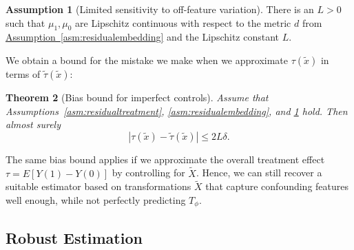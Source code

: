 \documentclass{article}
\theoremstyle{plain}
\newtheorem{theorem}{Theorem}[section]
\theoremstyle{definition}
\newtheorem{assumption}[theorem]{Assumption}
\theoremstyle{remark}
\newcommand{\myref}[2]{%
    \hyperref[#2]{#1~\ref*{#2}}%
}
\begin{document}
\begin{assumption}[Limited sensitivity to off-feature variation]
\label{asm:limitedsensitivity}
    There is an $L > 0$ such that $\mu_1, \mu_0$ are Lipschitz continuous with respect to the metric $d$ from \myref{Assumption}{asm:residualembedding} and the Lipschitz constant $L$.
\end{assumption}

We obtain a bound for the mistake we make when we approximate $\tau(\tilde{x})$ in terms of $\tilde{\tau}(\tilde{x})$:

\begin{theorem}[Bias bound for imperfect controls]
\label{thm:biasbound}
    Assume that Assumptions~\ref{asm:residualtreatment}, \ref{asm:residualembedding}, and \ref{asm:limitedsensitivity} hold. Then almost surely
    \begin{equation*}
        | \tau(\tilde{x}) - \tilde{\tau}(\tilde{x}) | \leq 2 L \delta.
    \end{equation*}
\end{theorem}
\vspace{-2pt}
The same bias bound applies if we approximate the overall treatment effect $\tau = E[Y(1) - Y(0)]$ by controlling for $\tilde{X}$.
Hence, we can still recover a suitable estimator based on transformations $\tilde{X}$ that capture confounding features well enough, while not perfectly predicting $T_\phi$.

\subsection{Robust Estimation}
\label{sec:estimation}
\end{document}
